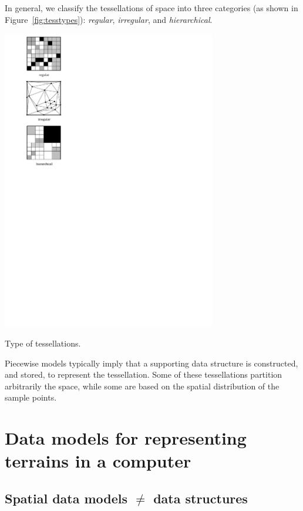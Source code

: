 In general, we  classify the tessellations of space into three categories (as shown in Figure~\ref{fig:tesstypes}): \emph{regular}, \emph{irregular}, and \emph{hierarchical}.%
\begin{marginfigure}
  \centering
  \includegraphics[width=0.7\textwidth]{figs/tesstype}
  \caption{Type of tessellations.}%
\label{fig:tesstypes}
\end{marginfigure}

%

Piecewise models typically imply that a supporting data structure is constructed, and stored, to represent the tessellation.
Some of these tessellations partition arbitrarily the space, while some are based on the spatial distribution of the sample points.


%
\section[Data models for terrains]{Data models for representing terrains in a computer}

\subsection{Spatial data models $\neq$ data structures}

